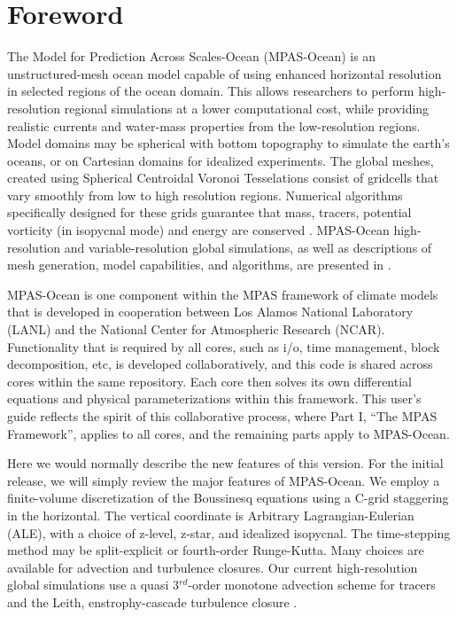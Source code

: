 \chapter*{Foreword}
\label{chap:foreword}

The Model for Prediction Across Scales-Ocean (MPAS-Ocean) is an unstructured-mesh ocean model capable of using enhanced horizontal resolution in selected regions of the ocean domain.  This allows researchers to perform high-resolution regional simulations at a lower computational cost, while providing realistic currents and water-mass properties from the low-resolution regions. Model domains may be spherical with bottom topography to simulate the earth's oceans, or on Cartesian domains for idealized experiments.  The global meshes, created using Spherical Centroidal Voronoi Tesselations \citep{Ringler_ea08od,Ringler_ea11mwr} consist of gridcells that vary smoothly from low to high resolution regions. Numerical algorithms specifically designed for these grids guarantee that mass, tracers, potential vorticity (in isopycnal mode) and energy are conserved \citep{Thurburn_ea09jcp,Ringler_ea10jcp}.  MPAS-Ocean high-resolution and variable-resolution global simulations, as well as descriptions of mesh generation, model capabilities, and algorithms, are presented in \citet{Ringler_ea13om}.

MPAS-Ocean is one component within the MPAS framework of climate models that is developed in cooperation between Los Alamos National Laboratory (LANL) and the National Center for Atmospheric Research (NCAR).  Functionality that is required by all cores, such as i/o, time management, block decomposition, etc, is developed collaboratively, and this code is shared across cores within the same repository.  Each core then solves its own differential equations and physical parameterizations within this framework.  This user's guide reflects the spirit of this collaborative process, where Part I, ``The MPAS Framework'', applies to all cores, and the remaining parts apply to MPAS-Ocean.

Here we would normally describe the new features of this version.  For the initial release, we will simply review the major features of MPAS-Ocean.  We employ a finite-volume discretization of the Boussinesq equations using a C-grid staggering in the horizontal.  
The vertical coordinate is Arbitrary Lagrangian-Eulerian (ALE), with a choice of z-level, z-star, and idealized isopycnal.  The time-stepping method may be split-explicit or fourth-order Runge-Kutta.  Many choices are available for advection and turbulence closures.  Our current high-resolution global simulations use a quasi 3$^{rd}$-order monotone advection scheme for tracers \citep{Skamarock:2011tc} and the Leith, enstrophy-cascade turbulence closure \citep{Leith:1996wu}.  


